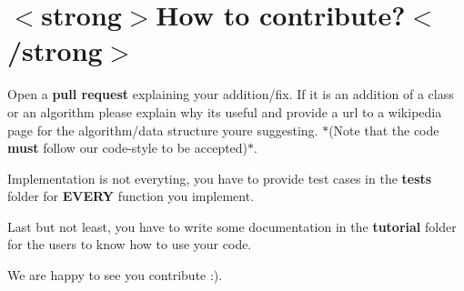 \chapter{\texorpdfstring{$<$}{<}strong\texorpdfstring{$>$}{>}How to contribute?\texorpdfstring{$<$}{<}/strong\texorpdfstring{$>$}{>}}
\hypertarget{md__2_users_2spirosmag_2_documents_2_algo_plus_2_c_o_n_t_r_i_b_u_t_e}{}\label{md__2_users_2spirosmag_2_documents_2_algo_plus_2_c_o_n_t_r_i_b_u_t_e}
\label{md__2_users_2spirosmag_2_documents_2_algo_plus_2_c_o_n_t_r_i_b_u_t_e_autotoc_md0}%
%

\begin{DoxyItemize}
\item Open a {\bfseries{pull request}} explaining your addition/fix. If it is an addition of a class or an algorithm please explain why it\textquotesingle{}s useful and provide a url to a wikipedia page for the algorithm/data structure you\textquotesingle{}re suggesting. \texorpdfstring{$\ast$}{*}(Note that the code {\bfseries{must}} follow our code-\/style to be accepted)\texorpdfstring{$\ast$}{*}.
\item Implementation is not everyting, you have to provide test cases in the {\bfseries{tests}} folder for {\bfseries{EVERY}} function you implement.
\item Last but not least, you have to write some documentation in the {\bfseries{tutorial}} folder for the users to know how to use your code.
\end{DoxyItemize}

We are happy to see you contribute \+:). ~\newline
 
